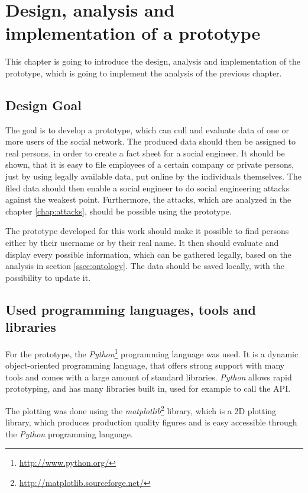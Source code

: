 \chapter{Design, analysis and implementation of a prototype}
\label{chap:prototype}

This chapter is going to introduce the design, analysis and implementation of
the prototype, which is going to implement the analysis of the previous
chapter.

\section{Design Goal}

The goal is to develop a prototype, which can cull and evaluate data of one or
more users of the \Twitter{} social network. The produced data should then be
assigned to real persons, in order to create a fact sheet for a social
engineer. It should be shown, that it is easy to file employees of a certain
company or private persons, just by using legally available data, put online by
the individuals themselves. The filed data should then enable a social
engineer to do social engineering attacks against the weakest point.
Furthermore, the attacks, which are analyzed in the chapter
\ref{chap:attacks}, should be possible using the prototype.

The prototype developed for this work should make it possible to find persons
either by their username or by their real name. It then should evaluate and
display every possible information, which can be gathered legally, based on the
analysis in section \ref{ssec:ontology}. The data should be saved locally,
with the possibility to update it.

\section{Used programming languages, tools and libraries}

For the prototype, the \textit{Python}\footnote{\url{http://www.python.org/}}
programming language was used. It is a dynamic object-oriented programming
language, that offers strong support with many tools and comes with a large
amount of standard libraries. \textit{Python} allows rapid prototyping, and has
many libraries built in, used for example to call the \Twitter{} API.

The plotting was done using the
\textit{matplotlib}\footnote{\url{http://matplotlib.sourceforge.net/}} library,
which is a 2D plotting library, which produces production quality figures and
is easy accessible through the \textit{Python} programming language.

